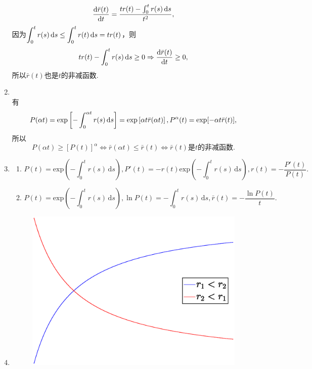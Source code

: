 \begin{enumerate}[label=\arabic{section}.\arabic*]
    \[\frac{\mathrm{d} \bar{r}(t)}{\mathrm{d} t}=\frac{tr(t)-\int_0^t r(s)\,\mathrm{d} s}{t^2},\]
    因为$\displaystyle \int_0^t r(s)\,\mathrm{d} s \leq \int_0^t r(t)\,\mathrm{d} s=tr(t)$，则
    \[tr(t)-\int_0^t r(s)\,\mathrm{d} s \geq 0 \Rightarrow \frac{\mathrm{d} \bar{r}(t)}{\mathrm{d} t} \geq 0,\]
    所以$\bar{r}(t)$也是$t$的非减函数.
    \item \pro\\
    有\[P(\alpha t)=\exp\left[-\int_0^{\alpha t}r(s)\,\mathrm{d} s\right]=\exp\left[\alpha t \bar{r}(\alpha t)\right],P^{\alpha}(t)=\exp[-\alpha t\bar{r}(t)],\]
    所以\[P(\alpha t) \geq [P(t)]^{\alpha} \iff \bar{r}(\alpha t) \leq \bar{r}(t) \iff \bar{r}(t)\text{是}t\text{的非减函数}.\]
    \item \pro
    \begin{enumerate}[label=\alph*)]
        \item \[P(t)=\mathrm{exp}\left(-\int_0^t r(s)\,\mathrm{d} s\right),P'(t)=-r(t)\mathrm{exp}\left(-\int_0^t r(s)\,\mathrm{d} s\right),r(t)=-\frac{P'(t)}{P(t)}.\]
        \item \[P(t)=\mathrm{exp}\left(-\int_0^t r(s)\,\mathrm{d} s\right),\ln P(t)=-\int_0^t r(s)\,\mathrm{d} s,\bar{r}(t)=-\frac{\ln P(t)}{t}.\]
    \end{enumerate}
    \item \sol
    \begin{figure}[H]
        \centering
        \includegraphics[scale=0.5]{4.35.eps}
    \end{figure}
\end{enumerate}
\clearpage